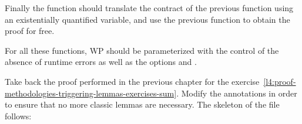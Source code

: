 Finally the function  should translate the contract
of the previous function using an existentially quantified variable, and use the
previous function to obtain the proof for free.


For all these functions, WP should be parameterized with the control of the
absence of runtime errors as well as the options
 and .




Take back the proof performed in the previous chapter for the
exercise~\ref{l4:proof-methodologies-triggering-lemmas-exercises-sum}. Modify
the annotations in order to ensure that no more classic lemmas are necessary.
The skeleton of the file follows:


